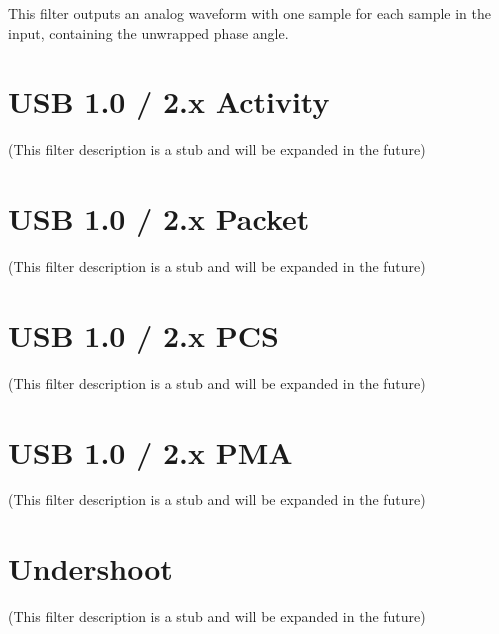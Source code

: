 This filter outputs an analog waveform with one sample for each sample in the input, containing the unwrapped phase
angle.

\pagebreak
\section{USB 1.0 / 2.x Activity}

(This filter description is a stub and will be expanded in the future)

\pagebreak
\section{USB 1.0 / 2.x Packet}

(This filter description is a stub and will be expanded in the future)

\pagebreak
\section{USB 1.0 / 2.x PCS}

(This filter description is a stub and will be expanded in the future)

\pagebreak
\section{USB 1.0 / 2.x PMA}

(This filter description is a stub and will be expanded in the future)

\pagebreak
\section{Undershoot}

(This filter description is a stub and will be expanded in the future)

\pagebreak
